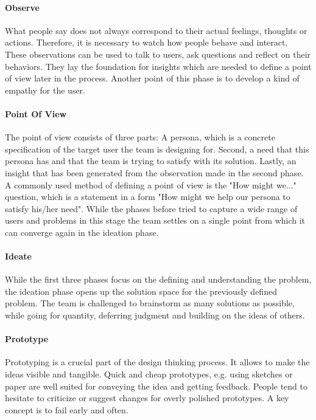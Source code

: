 \paragraph{Observe}
What people say does not always correspond to their actual feelings, thoughts or actions. Therefore, it is necessary to watch how people behave and interact. These observations can be used to talk to users, ask questions and reflect on their behaviors. They lay the foundation for insights which are needed to define a point of view later in the process. Another point of this phase is to develop a kind of empathy for the user.

\paragraph{Point Of View}
The point of view consists of three parts: A persona, which is a concrete specification of the target user the team is designing for. Second, a need that this persona has and that the team is trying to satisfy with its solution. Lastly, an insight that has been generated from the observation made in the second phase. A commonly used method of defining a point of view is the "How might we..." question, which is a statement in a form "How might we help our persona to satisfy his/her need".
While the phases before tried to capture a wide range of users and problems in this stage the team settles on a single point from which it can converge again in the ideation phase.

\paragraph{Ideate}
While the first three phases focus on the defining and understanding the problem, the ideation phase opens up the solution space for the previously defined problem. The team is challenged to brainstorm as many solutions as possible, while going for quantity, deferring judgment and building on the ideas of others.

\paragraph{Prototype}
Prototyping is a crucial part of the design thinking process. It allows to make the ideas visible and tangible. Quick and cheap prototypes, e.g. using sketches or paper are well suited for conveying the idea and getting feedback. People tend to hesitate to criticize or suggest changes for overly polished prototypes. A key concept is to fail early and often.

